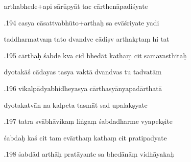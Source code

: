 \documentclass[article,12pt,a4paper]{memoir}%
\newcounter{parCount}
\begin{document}
	  
	  \pstart \leavevmode%
	arthabhede+api sārūpyāt tac cārthenāpadiśyate 
	{}
	\pend%
      

	  
	  \pstart {}.194 casya cāsattvabhūto+arthaḥ sa evāśriyate yadi 
	{}
	\pend%
      

	  
	  \pstart \leavevmode%
	taddharmatvaṃ tato dvandve cādiṣv arthakṛtaṃ hi tat 
	{}
	\pend%
      

	  
	  \pstart {}.195 cārthaḥ śabde kva cid bhedāt kathaṃ cit samavasthitaḥ 
	{}
	\pend%
      

	  
	  \pstart \leavevmode%
	dyotakāś cādayas tasya vaktā dvandvas tu tadvatām 
	{}
	\pend%
      

	  
	  \pstart {}.196 vikalpādyabhidheyasya   cārthasyānyapadārthatā 
	{}
	\pend%
      

	  
	  \pstart \leavevmode%
	dyotakatvān na kalpeta tasmāt sad upalakṣyate 
	{}
	\pend%
      

	  
	  \pstart {}.197 tatra svābhāvikaṃ liṅgaṃ śabdadharme vyapekṣite 
	{}
	\pend%
      

	  
	  \pstart \leavevmode%
	śabdaḥ kaś cit tam evārthaṃ kathaṃ cit pratipadyate 
	{}
	\pend%
      

	  
	  \pstart {}.198 śabdād arthāḥ pratāyante sa bhedānāṃ vidhāyakaḥ 
	{}
	\pend%
      
\end{document}
